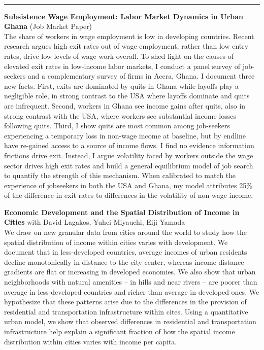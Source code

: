 \documentclass[11pt]{article}
\begin{document}
\newpage
\thispagestyle{plain}
 \\
\rule{\textwidth}{1pt}

\noindent \textbf{Subsistence Wage Employment: Labor Market Dynamics in Urban Ghana} (Job Market Paper)
\vspace{5pt}\\
\noindent The share of workers in wage employment is low in developing countries. Recent research argues high exit rates out of wage employment, rather than low entry rates, drive low levels of wage work overall. To shed light on the causes of elevated exit rates in low-income labor markets, I conduct a panel survey of job-seekers and a complementary survey of firms in Accra, Ghana. I document three new facts. First, exits are dominated by quits in Ghana while layoffs play a negligible role, in strong contrast to the USA where layoffs dominate and quits are infrequent. Second, workers in Ghana see income gains after quits, also in strong contrast with the USA, where workers see substantial income losses following quits. Third, I show quits are most common among job-seekers experiencing a temporary loss in non-wage income at baseline, but by endline have re-gained access to a source of income flows. I find no evidence information frictions drive exit. Instead, I argue volatility faced by workers outside the wage sector drives high exit rates and build a general equilibrium model of job search to quantify the strength of this mechanism. When calibrated to match the experience of jobseekers in both the USA and Ghana, my model attributes 25\% of the difference in exit rates to differences in the volatility of non-wage income. \\
\vspace*{5pt}


\noindent \textbf{Economic Development and the Spatial Distribution of Income in Cities} with David Lagakos, Yuhei Miyauchi, Eiji Yamada
\vspace{5pt}\\
\noindent We draw on new granular data from cities around the world to study how the spatial distribution of income within cities varies with development. We document that in less-developed countries, average incomes of urban residents decline monotonically in distance to the city center, whereas income-distance gradients are flat or increasing in developed economies. We also show that urban neighborhoods with natural amenities  -- in hills and near rivers -- are poorer than average in less-developed countries and richer than average in developed ones. We hypothesize that these patterns arise due to the differences in the provision of residential and transportation infrastructure within cites. Using a quantitative urban model, we show that observed differences in residential and transportation infrastructure help explain a significant fraction of how the spatial income distribution within cities varies with income per capita.

\end{document}
